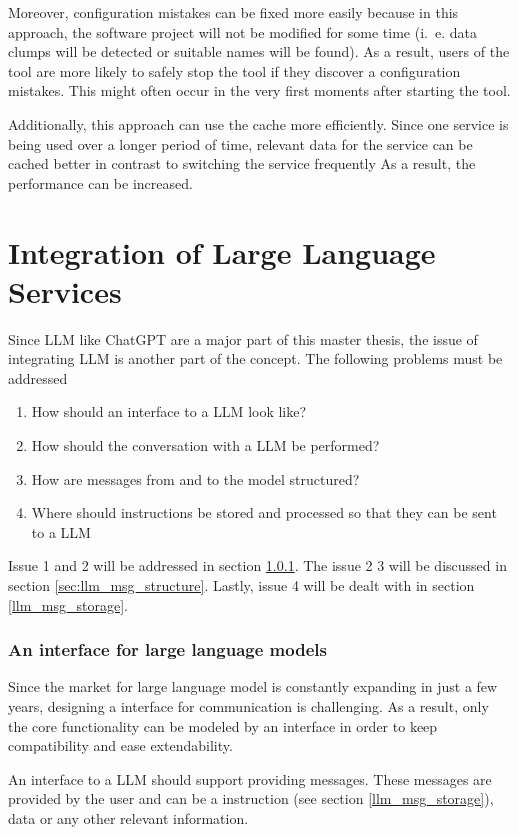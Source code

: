 Moreover, configuration mistakes can be fixed more easily because in this approach, the software project will not be modified for some time (i.~e. data clumps will be detected or suitable names will be found). As a result, users of the tool are more likely to safely stop the tool if they discover a configuration mistakes. This might often occur in the very first moments after starting the tool.

Additionally, this approach can use the cache more efficiently. Since one service is being used  over a longer period of time,  relevant data for the service can be cached better in contrast to switching the service frequently  As a result, the performance can be increased. 


\section{Integration of Large Language Services}

Since \ac{LLM} like ChatGPT are a major part of this master thesis, the issue of integrating \ac{LLM} is another part of the concept. The following problems must be addressed
\begin{enumerate}
    \item How should an interface to a \ac{LLM} look like?
    \item How should the conversation with a \ac{LLM} be performed?
    \item How are messages from and to the model structured?
    \item Where should instructions be stored and processed so that they can be sent to a \ac{LLM}
\end{enumerate}
Issue 1 and 2 will be addressed in section \ref{sec:llm_interface}. The issue 2 3 will be discussed in section \ref{sec:llm_msg_structure}. Lastly, issue 4 will be dealt with in section \ref{llm_msg_storage}.
\subsubsection{An interface for large language models}\label{sec:llm_interface}

Since the market for large language model is constantly expanding in just a few years, designing a interface for communication is challenging. As a result, only the core functionality can be modeled by an interface in order to keep compatibility and ease extendability. 

An interface to a \ac{LLM} should support providing messages. These messages are provided by the user and can be a instruction (see  section \ref{llm_msg_storage}), data or any other relevant information.

